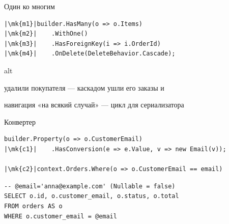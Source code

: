 \documentclass[aspectratio=169,10pt,t]{beamer}
\newcommand{\codesm}{\ttfamily\fontsize{7.6}{9.0}\selectfont}
\newcommand{\termsm}{\ttfamily\fontsize{6.6}{7.9}\selectfont}
\newcommand{\mk}[1]{\tikz[remember picture,overlay]\coordinate (#1) at (0,0.55ex);}
\begin{document}
\begin{frame}[fragile]{Один ко многим}
  \slidetop

\begin{lstlisting}[style=csharp,basicstyle=\codesm,escapechar=|]
|\mk{m1}|builder.HasMany(o => o.Items)
|\mk{m2}|    .WithOne()
|\mk{m3}|    .HasForeignKey(i => i.OrderId)
|\mk{m4}|    .OnDelete(DeleteBehavior.Cascade);
\end{lstlisting}

  \slidegap
  \begin{cbul}{alt}
    \item удалили покупателя --- каскадом ушли его заказы и 
    \item навигация «на всякий случай» --- цикл для сериализатора
  \end{cbul}
\end{frame}

\begin{frame}[plain]
\end{frame}

\begin{frame}[fragile]{Конвертер}
  \slidetop

\begin{lstlisting}[style=csharp,basicstyle=\codesm,escapechar=|]
builder.Property(o => o.CustomerEmail)
|\mk{c1}|    .HasConversion(e => e.Value, v => new Email(v));

|\mk{c2}|context.Orders.Where(o => o.CustomerEmail == email)
\end{lstlisting}

\begin{lstlisting}[style=term,basicstyle=\termsm]
-- @email='anna@example.com' (Nullable = false)
SELECT o.id, o.customer_email, o.status, o.total
FROM orders AS o
WHERE o.customer_email = @email
\end{lstlisting}

\end{frame}
\end{document}
